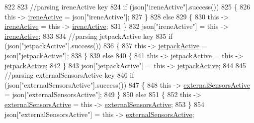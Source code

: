 \begin{DoxyCode}
822             
823             \textcolor{comment}{//parsing ireneActive key           }
824             \textcolor{keywordflow}{if} (json[\textcolor{stringliteral}{"ireneActive"}].success())
825             \{
826                 \textcolor{keyword}{this} -> \hyperlink{class_cool_board_a9c3f7ac625481ee2ae802a25d97a4ae0}{ireneActive} = json[\textcolor{stringliteral}{"ireneActive"}];
827             \}
828             \textcolor{keywordflow}{else}
829             \{
830                 \textcolor{keyword}{this} -> \hyperlink{class_cool_board_a9c3f7ac625481ee2ae802a25d97a4ae0}{ireneActive} = \textcolor{keyword}{this} -> \hyperlink{class_cool_board_a9c3f7ac625481ee2ae802a25d97a4ae0}{ireneActive};
831             \}
832             json[\textcolor{stringliteral}{"ireneActive"}] = \textcolor{keyword}{this} -> \hyperlink{class_cool_board_a9c3f7ac625481ee2ae802a25d97a4ae0}{ireneActive};
833             
834             \textcolor{comment}{//parsing jetpackActive key}
835             \textcolor{keywordflow}{if} (json[\textcolor{stringliteral}{"jetpackActive"}].success())
836             \{
837                 \textcolor{keyword}{this} -> \hyperlink{class_cool_board_a9be03a913d26e558328935ca3b59a75e}{jetpackActive} = json[\textcolor{stringliteral}{"jetpackActive"}];
838             \}
839             \textcolor{keywordflow}{else}
840             \{
841                 \textcolor{keyword}{this} -> \hyperlink{class_cool_board_a9be03a913d26e558328935ca3b59a75e}{jetpackActive} = \textcolor{keyword}{this} -> \hyperlink{class_cool_board_a9be03a913d26e558328935ca3b59a75e}{jetpackActive};
842             \}
843             json[\textcolor{stringliteral}{"jetpackActive"}] = \textcolor{keyword}{this} -> \hyperlink{class_cool_board_a9be03a913d26e558328935ca3b59a75e}{jetpackActive};
844 
845             \textcolor{comment}{//parsing externalSensorsActive key}
846             \textcolor{keywordflow}{if} (json[\textcolor{stringliteral}{"externalSensorsActive"}].success())
847             \{
848                 \textcolor{keyword}{this} -> \hyperlink{class_cool_board_a638b00b76aeb819ecfd4c10b8cdd7bb7}{externalSensorsActive} = json[\textcolor{stringliteral}{"externalSensorsActive"}];
849             \}
850             \textcolor{keywordflow}{else}
851             \{
852                 \textcolor{keyword}{this} -> \hyperlink{class_cool_board_a638b00b76aeb819ecfd4c10b8cdd7bb7}{externalSensorsActive} = \textcolor{keyword}{this} -> 
      \hyperlink{class_cool_board_a638b00b76aeb819ecfd4c10b8cdd7bb7}{externalSensorsActive};
853             \}
854             json[\textcolor{stringliteral}{"externalSensorsActive"}] = \textcolor{keyword}{this} -> \hyperlink{class_cool_board_a638b00b76aeb819ecfd4c10b8cdd7bb7}{externalSensorsActive};

\end{DoxyCode}
